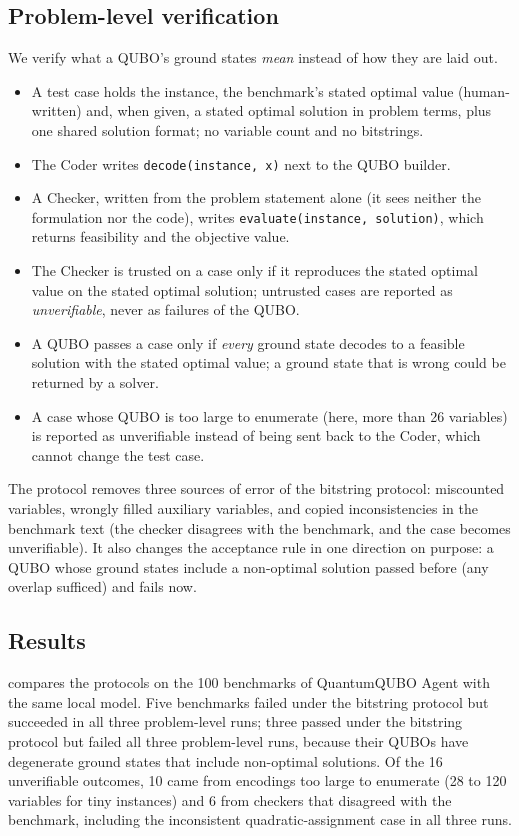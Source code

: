 \subsection{Problem-level verification}
We verify what a QUBO's ground states \emph{mean} instead of how they are laid out.
\begin{itemize}
  \item A test case holds the instance, the benchmark's stated optimal value (human-written) and, when given, a
        stated optimal solution in problem terms, plus one shared solution format; no variable count and no
        bitstrings.
  \item The Coder writes \texttt{decode(instance, x)} next to the QUBO builder.
  \item A Checker, written from the problem statement alone (it sees neither the formulation nor the code),
        writes \texttt{evaluate(instance, solution)}, which returns feasibility and the objective value.
  \item The Checker is trusted on a case only if it reproduces the stated optimal value on the stated optimal
        solution; untrusted cases are reported as \emph{unverifiable}, never as failures of the QUBO.
  \item A QUBO passes a case only if \emph{every} ground state decodes to a feasible solution with the stated
        optimal value; a ground state that is wrong could be returned by a solver.
  \item A case whose QUBO is too large to enumerate (here, more than 26 variables) is reported as unverifiable
        instead of being sent back to the Coder, which cannot change the test case.
\end{itemize}
The protocol removes three sources of error of the bitstring protocol: miscounted variables, wrongly filled
auxiliary variables, and copied inconsistencies in the benchmark text (the checker disagrees with the benchmark,
and the case becomes unverifiable). It also changes the acceptance rule in one direction on purpose: a QUBO whose
ground states include a non-optimal solution passed before (any overlap sufficed) and fails now.

\subsection{Results}
 compares the protocols on the 100 benchmarks of QuantumQUBO Agent with the same local model.
Five benchmarks failed under the bitstring protocol but succeeded in all three problem-level runs; three passed
under the bitstring protocol but failed all three problem-level runs, because their QUBOs have degenerate ground
states that include non-optimal solutions. Of the 16 unverifiable outcomes, 10 came from encodings too large to
enumerate (28 to 120 variables for tiny instances) and 6 from checkers that disagreed with the benchmark,
including the inconsistent quadratic-assignment case in all three runs.

